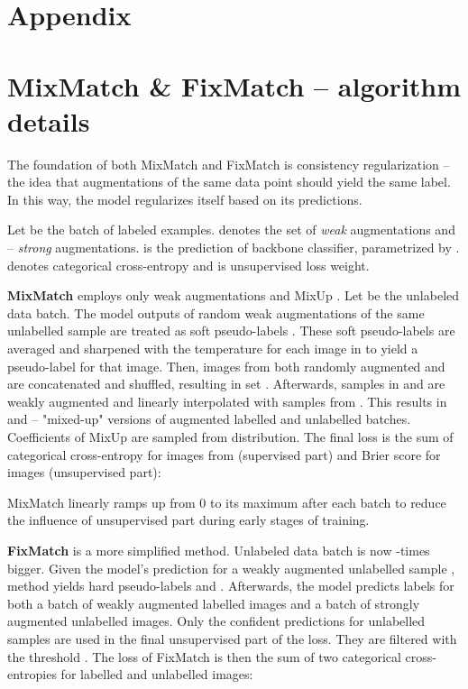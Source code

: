 \documentclass[runningheads]{llncs}
\begin{document}
\appendix
\newpage
\section*{Appendix}

\section{MixMatch \& FixMatch -- algorithm details} \label{app:algorithms}

The foundation of both MixMatch and FixMatch is consistency regularization -- the idea that augmentations of the same data point should yield the same label. In this way, the model regularizes itself based on its predictions.

Let  be the batch of labeled examples.  denotes the set of \emph{weak} augmentations and  -- \emph{strong} augmentations.  is the prediction of backbone classifier, parametrized by .  denotes categorical cross-entropy and  is unsupervised loss weight.

\textbf{MixMatch} employs only weak augmentations  and MixUp \cite{zhang2017mixup}. Let  be the unlabeled data batch. The model outputs of  random weak augmentations  of the same unlabelled sample are treated as soft pseudo-labels . These soft pseudo-labels are averaged and sharpened with the temperature  for each image in  to yield a pseudo-label for that image. Then, images from both randomly augmented  and  are concatenated and shuffled, resulting in set . Afterwards, samples in  and  are weakly augmented and linearly interpolated with samples from . This results in  and  -- "mixed-up" versions of augmented labelled and  unlabelled batches. Coefficients of MixUp are sampled from  distribution. The final loss is the sum of categorical cross-entropy for images from  (supervised part) and Brier score for  images (unsupervised part): 

MixMatch linearly ramps up  from 0 to its maximum after each batch to reduce the influence of unsupervised part during early stages of training.

\textbf{FixMatch} is a more simplified method. Unlabeled data batch  is now -times bigger. Given the model's prediction  for a weakly augmented unlabelled sample , method yields hard pseudo-labels  and . Afterwards, the model predicts labels for both a batch of weakly augmented labelled images and a batch of strongly augmented unlabelled images. Only the confident predictions for unlabelled samples are used in the final unsupervised part of the loss. They are filtered with the threshold . The loss of FixMatch is then the sum of two categorical cross-entropies for labelled and unlabelled images:
\end{document}
